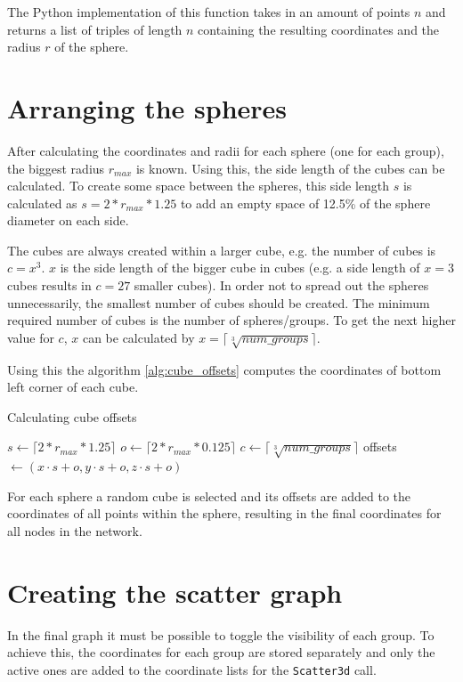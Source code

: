 The Python implementation of this function takes in an amount of points $n$ and returns a list of triples of length $n$ containing the resulting coordinates and the radius $r$ of the sphere.

\section{Arranging the spheres}
After calculating the coordinates and radii for each sphere (one for each group), the biggest radius $r_{max}$ is known. Using this, the side length of the cubes can be calculated. To create some space between the spheres, this side length $s$ is calculated as $s = 2 * r_{max} * 1.25$ to add an empty space of 12.5\% of the sphere diameter on each side.

The cubes are always created within a larger cube, e.g. the number of cubes is $c = x^3$. $x$ is the side length of the bigger cube in cubes (e.g. a side length of $x=3$ cubes results in $c=27$ smaller cubes). In order not to spread out the spheres unnecessarily, the smallest number of cubes should be created. The minimum required number of cubes is the number of spheres/groups. To get the next higher value for $c$, $x$ can be calculated by $x =\lceil\sqrt[3]{num\_groups}\rceil$.

Using this the algorithm \ref{alg:cube_offsets} computes the coordinates of bottom left corner of each cube.

\begin{algorithm}
\caption{Calculating cube offsets}
\label{alg:cube_offsets}
\begin{algorithmic}
\State $s \gets \lceil 2 * r_{max} * 1.25\rceil$
\State $o \gets \lceil 2 * r_{max} * 0.125\rceil$
\State $c \gets \lceil\sqrt[3]{num\_groups}\rceil$
    \State offsets $\gets (x \cdot s + o, y \cdot s + o, z \cdot s + o)$
\EndFor
\end{algorithmic}
\end{algorithm}

For each sphere a random cube is selected and its offsets are added to the coordinates of all points within the sphere, resulting in the final coordinates for all nodes in the network.

\section{Creating the scatter graph}
\label{sub:scatter_graph}
In the final graph it must be possible to toggle the visibility of each group. To achieve this, the coordinates for each group are stored separately and only the active ones are added to the coordinate lists for the \texttt{Scatter3d} call.

